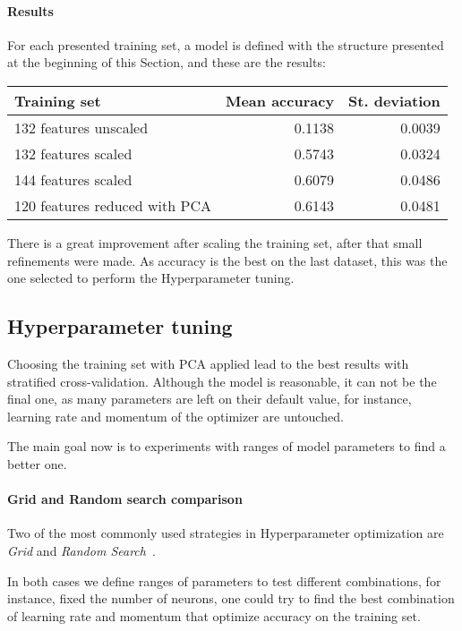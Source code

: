 \paragraph{Results}
For each presented training set, a model is defined 
with the structure presented at the beginning of this Section, 
and these are the results:

\begin{center}
    \begin{tabular}{ |l|r|r| } 
        \hline
        Training set & Mean accuracy & St. deviation \\
        \hline
        132 features unscaled &  0.1138 & 0.0039 \\
        132 features scaled &  0.5743 & 0.0324 \\
        144 features scaled &  0.6079 & 0.0486 \\
        120 features reduced with PCA &  0.6143 & 0.0481 \\
        \hline
    \end{tabular}
\end{center}

There is a great improvement after scaling the training set, after 
that small refinements were made.
As accuracy is the best on the last dataset, this was the one selected to 
perform the Hyperparameter tuning.

\subsection{Hyperparameter tuning}

Choosing the training set with PCA applied lead to the best results 
with stratified cross-validation. Although the model is reasonable, 
it can not be the final one, as many parameters are left on their default value, 
for instance, learning rate and momentum of the optimizer are untouched. 

The main goal now is to experiments with ranges of model parameters 
to find a better one.

\paragraph{Grid and Random search comparison}
Two of the most commonly used strategies in Hyperparameter optimization
are \emph{Grid} and \emph{Random Search}~\cite{random-grid}. 

In both cases we define ranges of parameters to test different combinations, 
for instance, fixed the number of neurons, one could try to find the best 
combination of learning rate and momentum that optimize accuracy on the training set.

